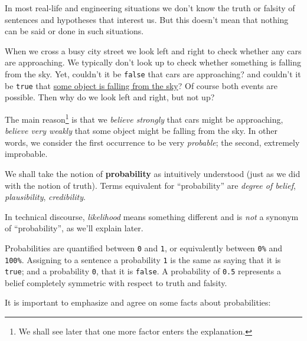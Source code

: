 \documentclass[
  a4paper,
  DIV=11,
  numbers=noendperiod,
  oneside]{scrreprt}
\begin{document}
In most real-life and engineering situations we don't know the truth or
falsity of sentences and hypotheses that interest us. But this doesn't
mean that nothing can be said or done in such situations.

When we cross a busy city street we look left and right to check whether
any cars are approaching. We typically don't look up to check whether
something is falling from the sky. Yet, couldn't it be \texttt{false}
that cars are approaching? and couldn't it be \texttt{true} that
\href{https://www.aerotime.aero/articles/32818-cessna-door-falls-off-lands-in-parking-lot}{some
object is falling from the sky}? Of course both events are possible.
Then why do we look left and right, but not up?

The main reason\footnote{We shall see later that one more factor enters
  the explanation.} is that we \emph{believe strongly} that cars might
be approaching, \emph{believe very weakly} that some object might be
falling from the sky. In other words, we consider the first occurrence
to be very \emph{probable}; the second, extremely improbable.

We shall take the notion of \textbf{probability} as intuitively
understood (just as we did with the notion of truth). Terms equivalent
for ``probability'' are \emph{degree of belief}, \emph{plausibility},
\emph{credibility}.

\begin{tcolorbox}[enhanced jigsaw, bottomrule=.15mm, leftrule=.75mm, toprule=.15mm, breakable, left=2mm, colframe=quarto-callout-important-color-frame, colback=white, arc=.35mm, opacityback=0, rightrule=.15mm]

\textbf{}\vspace{2mm}

 In technical discourse, \emph{likelihood}
means something different and is \emph{not} a synonym of
``probability'', as we'll explain later.

\end{tcolorbox}

Probabilities are quantified between \texttt{0} and \texttt{1}, or
equivalently between \texttt{0\%} and \texttt{100\%}. Assigning to a
sentence a probability \texttt{1} is the same as saying that it is
\texttt{true}; and a probability \texttt{0}, that it is \texttt{false}.
A probability of \texttt{0.5} represents a belief completely symmetric
with respect to truth and falsity.

It is important to emphasize and agree on some facts about
probabilities:
\end{document}
